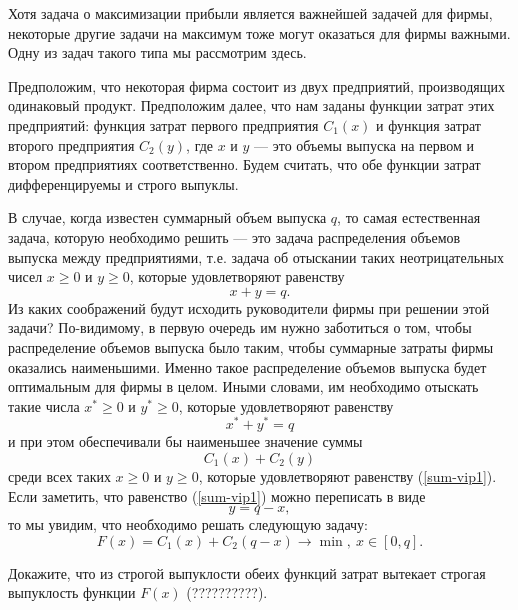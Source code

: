     Хотя задача о максимизации прибыли является важнейшей задачей
    для фирмы, некоторые другие задачи на максимум тоже могут
    оказаться для фирмы важными. Одну из задач
    такого типа мы рассмотрим здесь.

    Предположим, что некоторая фирма состоит из двух предприятий,
    производящих одинаковый продукт. Предположим далее, что нам заданы
    функции затрат этих предприятий: функция затрат первого предприятия
     $C_{1}(x)$ и функция затрат второго предприятия $C_{2}(y)$, где $x$ и $y$ --- это
     объемы выпуска на первом и втором предприятиях соответственно.
    Будем считать, что обе функции затрат дифференцируемы и строго
    выпуклы.

В случае,
     когда известен суммарный объем выпуска $q$, то самая естественная
     задача, которую необходимо решить --- это задача распределения объемов
     выпуска между предприятиями, т.е. задача об отыскании таких неотрицательных
      чисел $x\geqslant0$ и $y\geqslant0$, которые удовлетворяют равенству
\begin{equation}
    \label{sum-vip1}
    x+y=q.
\end{equation}
    Из каких соображений будут исходить руководители фирмы при решении этой задачи?
    По-видимому, в первую очередь им нужно заботиться о том, чтобы распределение
    объемов выпуска было таким, чтобы суммарные затраты фирмы оказались наименьшими.
    Именно такое распределение объемов выпуска будет оптимальным для фирмы в целом.
    Иными словами, им необходимо отыскать такие числа
    $x^{*}\geqslant0$ и $y^{*}\geqslant0$, которые
    удовлетворяют равенству
\begin{equation}
    \label{sum-vip2}
    x^{*}+y^{*}=q
\end{equation}
    и при этом обеспечивали бы наименьшее значение суммы
    \[C_{1}(x)+C_{2}(y)\]
    среди всех таких $x\geqslant0$ и $y\geqslant0$, которые
    удовлетворяют равенству (\ref{sum-vip1}).
    Если заметить, что равенство (\ref{sum-vip1}) можно переписать в виде
    \[y=q-x,\]
    то мы увидим, что необходимо решать следующую задачу:
\begin{equation}
\label{tsel-fun}
    F(x)=C_{1}(x)+C_{2}(q-x)\rightarrow\min, \ x\in[0,q].
\end{equation}
\begin{exer}
    Докажите, что из строгой выпуклости обеих функций затрат
    вытекает строгая выпуклость функции $F(x)$ (??????????).
\end{exer}

